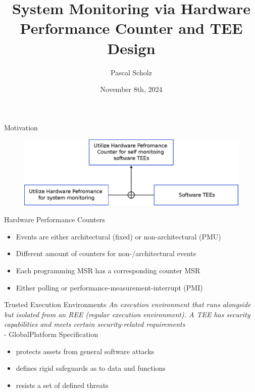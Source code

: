 \documentclass[aspectratio=169]{beamer}
\title[System Monitoring via Hardware Performance Counter and TEE Design]{System Monitoring via Hardware Performance Counter and TEE Design}
\author{Pascal Scholz}
\date{November 8th, 2024}
\begin{document}
\maketitle


\begin{frame}{Motivation}
    \begin{figure}
        \includegraphics[width=\textwidth]{images/components.eps}
    \end{figure}
\end{frame}
\begin{frame}{Hardware Performance Counters}
    \begin{itemize}
        \item Events are either architectural (fixed) or non-architectural (PMU)
        \item Different amount of counters for non-/architectural events
        \item Each programming MSR has a corresponding counter MSR
        \item Either polling or performance-measurement-interrupt (PMI)
    \end{itemize}
\end{frame}
\begin{frame}{Trusted Execution Environments}
    \textit{An execution environment that runs alongside but isolated from an REE (regular execution environment).
        A TEE has security capabilities and meets certain security-related
        requirements} \\ - GlobalPlatform Specification
    \bigskip
    \begin{itemize}
        \item protects assets from general software attacks
        \item defines rigid safeguards as to data and functions
        \item resists a set of defined threats
    \end{itemize}
\end{frame}
\end{document}
